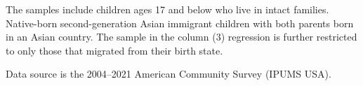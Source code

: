 \begin{table}[H]
{\begin{threeparttable}
\begin{tablenotes}
\item[2] \footnotesize{The samples include children ages 17 and below who live in intact families. 
                      Native-born second-generation Asian immigrant children with both
                      parents born in an Asian country. The sample in the column (3) regression is further restricted to only those that migrated from their birth state.}
\item[3] \footnotesize{Data source is the 2004--2021 American Community Survey (IPUMS USA).}
\end{tablenotes}
\end{threeparttable}}
\end{table}
